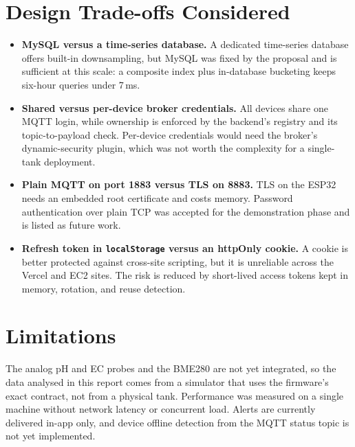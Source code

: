 \documentclass[11pt,a4paper,oneside]{report}
\newcommand{\code}[1]{\texttt{#1}}
\begin{document}
\section{Design Trade-offs Considered}
\begin{itemize}
  \item \textbf{MySQL versus a time-series database.} A dedicated time-series database
        offers built-in downsampling, but MySQL was fixed by the proposal and is
        sufficient at this scale: a composite index plus in-database bucketing keeps
        six-hour queries under 7\,ms.
  \item \textbf{Shared versus per-device broker credentials.} All devices share one MQTT
        login, while ownership is enforced by the backend's registry and its
        topic-to-payload check. Per-device credentials would need the broker's
        dynamic-security plugin, which was not worth the complexity for a single-tank
        deployment.
  \item \textbf{Plain MQTT on port 1883 versus TLS on 8883.} TLS on the ESP32 needs an
        embedded root certificate and costs memory. Password authentication over plain
        TCP was accepted for the demonstration phase and is listed as future work.
  \item \textbf{Refresh token in \code{localStorage} versus an httpOnly cookie.} A
        cookie is better protected against cross-site scripting, but it is unreliable
        across the Vercel and EC2 sites. The risk is reduced by short-lived access tokens
        kept in memory, rotation, and reuse detection.
\end{itemize}

\section{Limitations}
The analog pH and EC probes and the BME280 are not yet integrated, so the data analysed
in this report comes from a simulator that uses the firmware's exact contract, not from
a physical tank. Performance was measured on a single machine without network latency
or concurrent load. Alerts are currently delivered in-app only, and device offline
detection from the MQTT status topic is not yet implemented.

\end{document}
